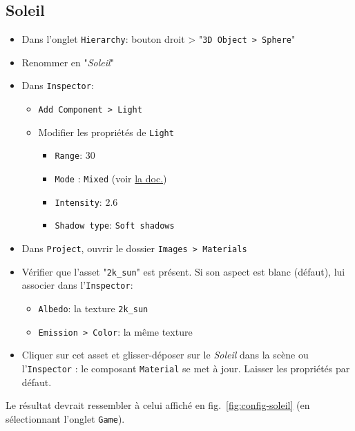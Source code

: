 \documentclass[a4paper,10pt]{article}
\newenvironment{solution}%
{\begin{tcolorbox}[breakable,colback=red!5!white,colframe=red!75!black,title=Solution]}%
{\end{tcolorbox}}
\begin{document}
\ifversionenseignant
\begin{solution}
	\subsection{Soleil}
	
	\begin{itemize}
		\item Dans l'onglet \texttt{Hierarchy}:  bouton droit > "\texttt{3D Object > Sphere}"
		\item Renommer en "\textit{Soleil}"
		\item Dans \texttt{Inspector}:
		\begin{itemize}
			\item \texttt{Add Component > Light}
			\item Modifier les propriétés de \texttt{Light}
			\begin{itemize}
				\item \texttt{Range}: $30$
				\item \texttt{Mode} : \texttt{Mixed} (voir \href{https://docs.unity3d.com/Manual/LightMode-Mixed.html}{la doc.})
				\item \texttt{Intensity}: $2.6$
				\item \texttt{Shadow type}: \texttt{Soft shadows}
			\end{itemize}
		\end{itemize}
		\item Dans \texttt{Project}, ouvrir le dossier \texttt{Images > Materials}
		\item Vérifier que l'asset "\texttt{2k\_sun}" est présent. Si son aspect est blanc (défaut), lui associer dans l'\texttt{Inspector}:
		\begin{itemize}
			\item \texttt{Albedo}: la texture \texttt{2k\_sun}
			\item \texttt{Emission > Color}: la même texture
		\end{itemize}
		\item Cliquer sur cet asset et glisser-déposer sur le \textit{Soleil} dans la scène ou l'\texttt{Inspector} : le composant \texttt{Material} se met à jour. Laisser les propriétés par défaut.
	\end{itemize}

Le résultat devrait ressembler à celui affiché en fig.~\ref{fig:config-soleil} (en sélectionnant l'onglet \texttt{Game}).
\end{solution}
\end{document}
